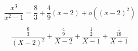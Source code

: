 \begin{displaymath}
\frac{x^3}{x^2-1} = \frac{8}{3}+\frac{4}{9}(x-2) + o((x-2)^2)
\end{displaymath}

\begin{displaymath}
 \frac{\frac{8}{3}}{(X-2)^2} + \frac{\frac{4}{9}}{X-2} + \frac{\frac{1}{2}}{X-1} + \frac{\frac{1}{18}}{X+1}
\end{displaymath}
